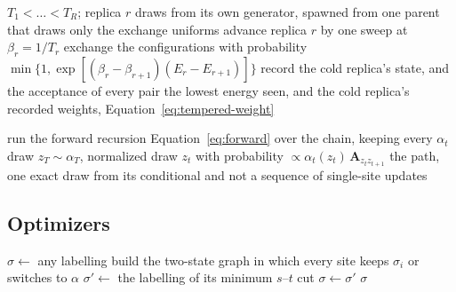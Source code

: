 \documentclass[11pt,a4paper]{article}
\begin{document}
\begin{algorithm}[htbp]
\caption{Parallel tempering over $R$ replicas, Equation~\ref{eq:exchange}}
\label{alg:parallel-tempering}
\begin{algorithmic}[1]
\State $T_1 < \dots < T_R$; replica $r$ draws from its own generator, spawned
       from one parent that draws only the exchange uniforms
    \State advance replica $r$ by one sweep at $\beta_r = 1/T_r$
  \EndFor
    \State exchange the configurations with probability
           $\min\{1, \exp[(\beta_r - \beta_{r+1})(E_r - E_{r+1})]\}$
  \EndFor
  \State record the cold replica's state, and the acceptance of every pair
\EndFor
\State \Return the lowest energy seen, and the cold replica's recorded
       weights, Equation~\ref{eq:tempered-weight}
\end{algorithmic}
\end{algorithm}

\begin{algorithm}[htbp]
\caption{One block sweep over a chain, given the rest of the model}
\label{alg:chain-block}
\begin{algorithmic}[1]
\State run the forward recursion Equation~\ref{eq:forward} over the chain,
       keeping every $\alpha_t$
\State draw $z_T \sim \alpha_T$, normalized
  \State draw $z_t$ with probability
         $\propto \alpha_t(z_t)\, \mathbf{A}_{z_t z_{t+1}}$
\EndFor
\State \Return the path, one exact draw from its conditional and not a
       sequence of single-site updates
\end{algorithmic}
\end{algorithm}

\subsection{Optimizers}
\label{app:algorithms:optimizers}

\begin{algorithm}[htbp]
\caption{Alpha expansion, Equation~\ref{eq:alpha-expansion}}
\label{alg:alpha-expansion}
\begin{algorithmic}[1]
\State $\sigma \gets$ any labelling
\Repeat
    \State build the two-state graph in which every site keeps $\sigma_i$ or
           switches to $\alpha$
    \State $\sigma' \gets$ the labelling of its minimum $s$--$t$ cut
     $\sigma \gets \sigma'$ \EndIf
  \EndFor
{}
\State \Return $\sigma$ 
\end{algorithmic}
\end{algorithm}
\end{document}
